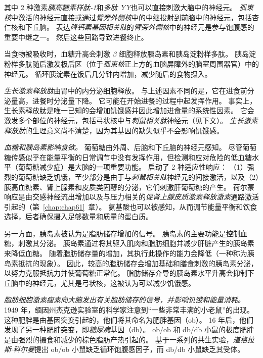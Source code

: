 其中 2 种激素\textit{胰高糖素样肽-1}和\textit{多肽 YY}也可以直接刺激大脑中的神经元。
\textit{孤束核}中激活的神经元直接或通过\textit{臂旁外侧核}中的中继投射到前脑中的神经元，包括杏仁核和下丘脑。
表达\textit{降钙素基因相关肽}的\textit{臂旁外侧核}中的神经元是参与饱腹感的重要中继之一。
然后这些回路导致进餐终止。


当食物被吸收时，血糖升高会刺激 $ \beta $ 细胞释放胰岛素和胰岛淀粉样多肽。
胰岛淀粉样多肽随后激发极后区（位于\textit{孤束核}正上方的血脑屏障外的脑室周围器官）中的神经元。
循环胰淀素在饭后几分钟内增加，减少随后的食物摄入。


\textit{生长激素释放肽}由胃中的内分泌细胞释放。
与上述因素不同的是，它在进食前分泌量高，进餐时分泌量下降。
它可能在开始进餐的过程中起发挥作用。
事实上，生长素释放肽是唯一已知的会增加饥饿感并因此增加进食量的系统性因素。
它会激发多个部位的神经元，包括弓状核中与\textit{刺鼠相关肽}神经元（见下文）。
\textit{生长激素释放肽}的生理意义尚不清楚，因为其基因的缺失似乎不会影响饥饿感。


\textit{血糖和胰岛素影响食欲。}
葡萄糖由外周、后脑和下丘脑的神经元感知。
尽管葡萄糖传感似乎在能量平衡的日常调节中没有发挥作用，但检测和应对危险的低血糖水平（葡萄糖减少症）是大脑的一项重要功能。
启动了 2 种适应性响应：
（1）强烈的葡萄糖缺乏饥饿，至少部分是由于与\textit{刺鼠相关肽}神经元的间接激活，以及（2）胰高血糖素、肾上腺素和皮质类固醇的分泌，它们刺激肝葡萄糖的产生。
荷尔蒙响应是由交感神经流出增加以及与压力相关的\textit{促肾上腺皮质激素释放激素}通路激活引起的（第~\ref{chap:chap61}~章）。
氨基酸也可以被感知，从而调节能量平衡和饮食选择，后者确保摄入足够数量和质量的蛋白质。


另一方面，胰岛素被认为是脂肪储存增加的信号。
胰岛素的主要功能是控制血糖，刺激其分泌。
胰岛素通过将其驱入肌肉和脂肪细胞并减少肝脏产生的胰岛素来降低血糖。
随着脂肪储存量的增加，其执行此操作的能力会降低（一种称为胰岛素抵抗的现象）。
因此，较高的脂肪储存会增加基础和膳食刺激的胰岛素分泌，以努力克服抵抗力并使葡萄糖正常化。
脂肪储存介导的胰岛素水平升高会抑制下丘脑中的神经元，尤其是弓状核，这被认为可以减少饥饿感。


\textit{脂肪细胞激素瘦素向大脑发出有关脂肪储存的信号，并影响饥饿和能量消耗。}
1949 年，缅因州杰克逊实验室的科学家注意到“一些非常丰满的小老鼠”的出现。
这种肥胖是由基因突变引起的，他们将其命名为肥胖基因（ob）。
16 年后，他们发现了另一种肥胖突变，即\textit{糖尿病}基因（db）。
ob/ob 和 db/db 小鼠的极度肥胖是由强烈的摄食和减少的棕色脂肪产热引起的。
基于一系列的共生实验，\textit{道格拉斯$\cdot$科尔曼}提出 ob/ob 小鼠缺乏循环饱腹感因子，而 db/db 小鼠缺乏其受体。


